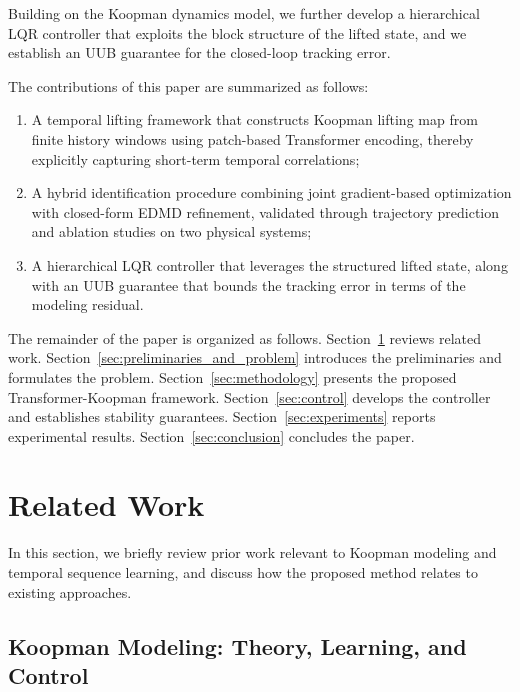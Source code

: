 \documentclass[journal]{IEEEtran}
\begin{document}
Building on the Koopman dynamics model, we further develop a hierarchical LQR controller that exploits  the block structure of the lifted state, and we establish an UUB guarantee for the closed-loop tracking error. 

The contributions of this paper are summarized as follows:
\begin{enumerate}
\item A temporal lifting framework that constructs Koopman lifting map from finite history windows using patch-based Transformer encoding, thereby explicitly capturing short-term temporal correlations;
\item A hybrid identification procedure combining joint gradient-based optimization with closed-form EDMD refinement, validated through trajectory prediction and ablation studies on two physical systems;
\item A hierarchical LQR controller that leverages the structured lifted state, along with an UUB guarantee that bounds the tracking error in terms of the modeling residual.
\end{enumerate}

The remainder of the paper is organized as follows. Section~\ref{sec:related_work} reviews related work. Section~\ref{sec:preliminaries_and_problem} introduces the preliminaries and formulates the problem. Section~\ref{sec:methodology} presents the proposed Transformer-Koopman framework. Section~\ref{sec:control} develops the controller and establishes stability guarantees. Section~\ref{sec:experiments} reports experimental results. Section~\ref{sec:conclusion} concludes the paper.


\section{Related Work}
\label{sec:related_work}

In this section, we briefly review prior work relevant to Koopman modeling and temporal sequence learning, and  discuss how the proposed method relates to existing approaches.

\subsection{Koopman Modeling: Theory, Learning, and Control}
\end{document}

